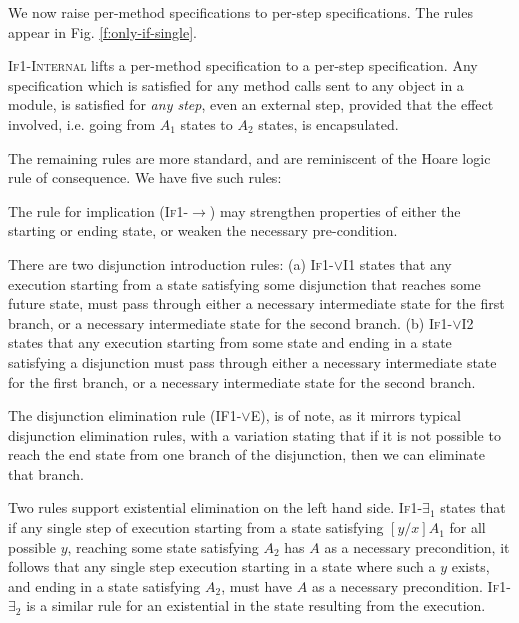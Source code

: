 We now raise per-method \Nec specifications 
to per-step \Nec specifications. 
The rules appear in Fig. \ref{f:only-if-single}.

\textsc{If1-Internal} 
 lifts a per-method \Nec specification to a per-step \Nec specification.
Any \Nec specification which is satisfied for any method
calls sent to any object in a module, is satisfied for \emph{any step}, even
an external step, provided that the effect involved, i.e. going from $A_1$ states to
$A_2$ states, is encapsulated.

 The remaining rules are more standard, and are reminiscent of the Hoare logic rule of consequence.
 We have five such rules:
 
The  rule for implication (\textsc{If1-$\longrightarrow$}) may strengthen
 properties of either the starting or ending state, or 
weaken the necessary pre-condition. 

There are two disjunction introduction rules: 
(a) \textsc{If1-$\vee$I1} states that any execution
starting from a state satisfying some disjunction that reaches some future state, 
must pass through either a necessary 
intermediate state for the first branch, or a necessary 
intermediate state for the second branch.
(b) \textsc{If1-$\vee$I2} states that any execution 
starting from some state and ending in a state satisfying a disjunction
must pass through either a necessary intermediate state for 
the first branch, or a necessary intermediate state for the second branch.


The disjunction
elimination rule (\textsc{IF1-$\vee$E}), 
is of note, as it mirrors typical disjunction elimination
rules, with a variation stating that if it is not possible  to reach 
the end state from one branch of the disjunction, then we can eliminate 
that branch. 

Two rules support existential elimination on the left hand side.
\textsc{If1-$\exists_1$} states that if any single step of execution starting
from a state satisfying $[y/x]A_1$ for all possible $y$, reaching some state satisfying
$A_2$ has $A$ as a necessary precondition, it follows that any single step execution
starting in a state where such a $y$ exists, and ending in a state satisfying $A_2$,
must have $A$ as a necessary precondition. \textsc{If1-$\exists_2$} is a similar rule
for an existential in the state resulting from the execution.


